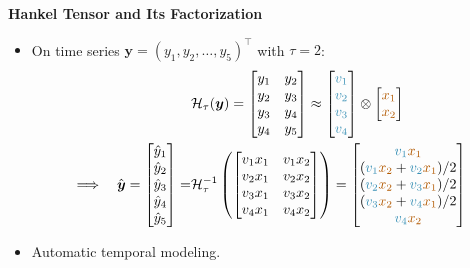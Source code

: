 \documentclass{beamer}
\begin{document}
\begin{frame}{\color{black}\textbf{Hankel Tensor and Its Factorization}}
\begin{itemize}
\begin{itemize}
\item[\color{black}\circ] On time series $\boldsymbol{y}=(y_1,y_2,\ldots,y_5)^\top$ with $\tau=2$:
\begin{equation*}
\begin{aligned}
&\mathcal{H}_{\tau}(\boldsymbol{y})=\begin{bmatrix}
y_1 & y_2 \\ y_2 & y_3 \\ y_3 & y_4 \\ y_4 & y_5 \\
\end{bmatrix}\approx\begin{bmatrix}
{\color{cyan!70!black}v_1} \\ 
{\color{cyan!70!black}v_2} \\ {\color{cyan!70!black}v_3} \\ {\color{cyan!70!black}v_4} \\
\end{bmatrix}\otimes\begin{bmatrix}
{\color{orange!70!black}x_1} \\ 
{\color{orange!70!black}x_2} \\
\end{bmatrix} \\
\Longrightarrow\quad\hat{\boldsymbol{y}}=\begin{bmatrix}
\hat{y}_1 \\
\hat{y}_2 \\
\hat{y}_3 \\
\hat{y}_4 \\
\hat{y}_5 \\
\end{bmatrix}=&\mathcal{H}_{\tau}^{-1}\left(\begin{bmatrix}
v_1x_1 & v_1x_2 \\
v_2x_1 & v_2x_2 \\
v_3x_1 & v_3x_2 \\
v_4x_1 & v_4x_2 \\
\end{bmatrix}\right)=\begin{bmatrix}
{\color{cyan!70!black}v_1}{\color{orange!70!black}x_1} \\ ({\color{cyan!70!black}v_1}{\color{orange!70!black}x_2}+{\color{cyan!70!black}v_2}{\color{orange!70!black}x_1})/2 \\ ({\color{cyan!70!black}v_2}{\color{orange!70!black}x_2}+{\color{cyan!70!black}v_3}{\color{orange!70!black}x_1})/2 \\ ({\color{cyan!70!black}v_3}{\color{orange!70!black}x_2}+{\color{cyan!70!black}v_4}{\color{orange!70!black}x_1})/2 \\ {\color{cyan!70!black}v_4}{\color{orange!70!black}x_2} \\
\end{bmatrix}
\end{aligned}
\end{equation*}
\item[\color{black}\circ] Automatic temporal modeling.
\end{itemize}
\end{itemize}


\end{frame}
\end{document}

